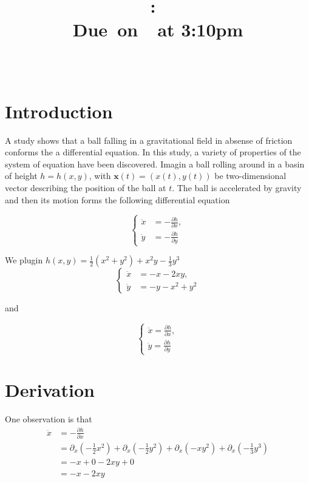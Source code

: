\documentclass{article}
\title{
    \vspace{2in}
    \textmd{\textbf{\hmwkClass:\ \hmwkTitle}}\\
    \normalsize\vspace{0.1in}\small{Due\ on\ \hmwkDueDate\ at 3:10pm}\\
    \vspace{0.1in}\large{\textit{\hmwkClassInstructor\ \hmwkClassTime}}
    \vspace{3in}
}
\author{\hmwkAuthorName}
\date{}
\begin{document}
\maketitle

\pagebreak

\section{Introduction}
	A study shows that a ball falling in a gravitational field in absense of friction conforms the a 
	differential equation. In this study, a variety of properties of the system of equation have been discovered. 
	Imagin a ball rolling around in a basin of height $h = h(x, y)$, with $\mathbf{x}(t) = (x(t), y(t))$ be two-dimensional vector describing the position of the ball at $t$.
	The ball is accelerated by gravity and then its motion forms the following differential equation
	
	\begin{equation}
		\begin{cases}
			\ddot{x} &= -\frac{\partial h}{\partial x}, \\
			\ddot{y} &= -\frac{\partial h}{\partial y}
		\end{cases}
	\end{equation}

	We plugin $h(x, y) = \frac{1}{2}(x^2+y^2) + x^2y - \frac{1}{3}y^3$
	\begin{equation}
		\begin{cases}
			\ddot{x} &= -x - 2xy, \\
			\ddot{y} &= -y -x^2+y^2
		\end{cases}
	\end{equation}

	and

	\begin{equation}
		\begin{cases}
			\ddot{x} = \frac{\partial h}{\partial x}, \\
			\ddot{y} = \frac{\partial h}{\partial y}
		\end{cases}
	\end{equation}

\section*{Derivation}
	One observation is that 
	\begin{align*}
		\ddot{x} &= -\frac{\partial h}{\partial x} \\
		         &= \partial_x\left(-\frac{1}{2}x^2\right) +  \partial_x\left(-\frac{1}{2}y^2\right) + \partial_x(-xy^2)+\partial_x(-\frac{1}{3}y^3) \\ 
				 &= -x + 0 - 2xy + 0 \\
				 &= -x -2xy
	\end{align*}
\end{document}
